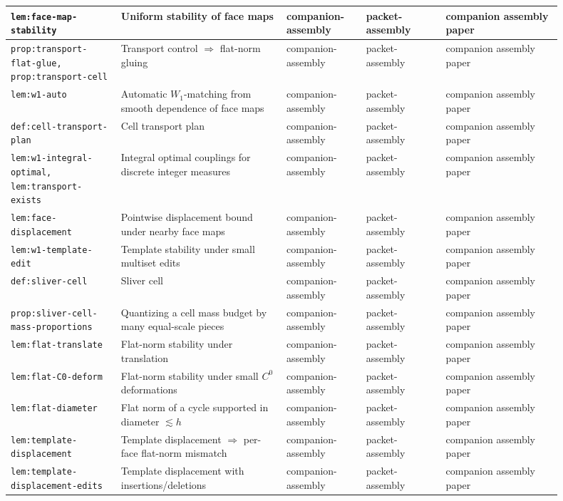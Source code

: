 \documentclass[11pt]{article}
\numberwithin{equation}{section}  %
\theoremstyle{plain}
\theoremstyle{definition}
\theoremstyle{remark}
\begin{document}
\begin{longtable}{|p{0.18\linewidth}|p{0.27\linewidth}|p{0.13\linewidth}|p{0.13\linewidth}|p{0.19\linewidth}|}
\texttt{lem:face-map-stability} & Uniform stability of face maps & companion-assembly & packet-assembly & companion assembly paper \\ \hline
\texttt{prop:transport-flat-glue, prop:transport-cell} & Transport control $\Rightarrow$ flat-norm gluing & companion-assembly & packet-assembly & companion assembly paper \\ \hline
\texttt{lem:w1-auto} & Automatic $W_1$-matching from smooth dependence of face maps & companion-assembly & packet-assembly & companion assembly paper \\ \hline
\texttt{def:cell-transport-plan} & Cell transport plan & companion-assembly & packet-assembly & companion assembly paper \\ \hline
\texttt{lem:w1-integral-optimal, lem:transport-exists} & Integral optimal couplings for discrete integer measures & companion-assembly & packet-assembly & companion assembly paper \\ \hline
\texttt{lem:face-displacement} & Pointwise displacement bound under nearby face maps & companion-assembly & packet-assembly & companion assembly paper \\ \hline
\texttt{lem:w1-template-edit} & Template stability under small multiset edits & companion-assembly & packet-assembly & companion assembly paper \\ \hline
\texttt{def:sliver-cell} & Sliver cell & companion-assembly & packet-assembly & companion assembly paper \\ \hline
\texttt{prop:sliver-cell-mass-proportions} & Quantizing a cell mass budget by many equal-scale pieces & companion-assembly & packet-assembly & companion assembly paper \\ \hline
\texttt{lem:flat-translate} & Flat-norm stability under translation & companion-assembly & packet-assembly & companion assembly paper \\ \hline
\texttt{lem:flat-C0-deform} & Flat-norm stability under small $C^0$ deformations & companion-assembly & packet-assembly & companion assembly paper \\ \hline
\texttt{lem:flat-diameter} & Flat norm of a cycle supported in diameter $\lesssim h$ & companion-assembly & packet-assembly & companion assembly paper \\ \hline
\texttt{lem:template-displacement} & Template displacement $\Rightarrow$ per-face flat-norm mismatch & companion-assembly & packet-assembly & companion assembly paper \\ \hline
\texttt{lem:template-displacement-edits} & Template displacement with insertions/deletions & companion-assembly & packet-assembly & companion assembly paper \\ \hline

\end{longtable}
\end{document}
